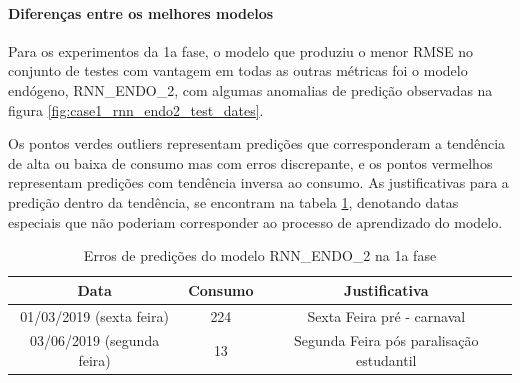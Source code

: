         \paragraph{Diferenças entre os melhores modelos}
        Para os experimentos da 1a fase, o modelo que produziu o menor RMSE no conjunto de testes com vantagem em todas as outras métricas foi o modelo endógeno, RNN\_ENDO\_2, com algumas anomalias de predição observadas na figura \ref{fig:case1_rnn_endo2_test_dates}.
        \begin{figure}[H]
        \end{figure}
        
        Os pontos verdes outliers representam predições que corresponderam a tendência de alta ou baixa de consumo mas com erros discrepante, e os pontos vermelhos representam predições com tendência inversa ao consumo.
        As justificativas para a predição dentro da tendência, se encontram na tabela \ref{table:rnn_endo_2_green}, denotando datas especiais que não poderiam corresponder ao processo de aprendizado do modelo.
            \begin{table}[!ht]
                \centering
                \caption{Erros de predições do modelo RNN\_ENDO\_2 na 1a fase}
                \label{table:rnn_endo_2_green}
                 \begin{tabular}{|c|c|c|}
                 \rowcolor{gray!50}
                 \hline 
                Data & Consumo & Justificativa\\ \hline    
                01/03/2019 (sexta feira)    & 224 & Sexta Feira pré - carnaval\\
                03/06/2019 (segunda feira)  &  13 & Segunda Feira pós paralisação estudantil\\ \hline 
                \end{tabular} 
            \end{table}
            
